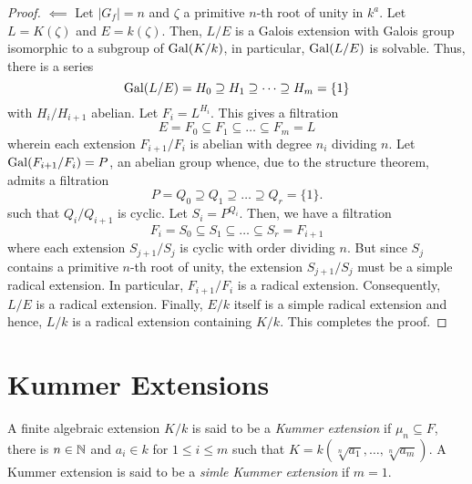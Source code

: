 \begin{proof}
    $\impliedby$ Let $|G_f| = n$ and $\zeta$ a primitive $n$-th root of unity in $k^a$. Let $L = K(\zeta)$ and $E = k(\zeta)$. Then, $L/E$ is a Galois extension with Galois group isomorphic to a subgroup of $\operatorname{Gal}(K/k)$, in particular, $\operatorname{Gal}(L/E)$ is solvable. Thus, there is a series 
    \begin{equation*}
        \operatorname{Gal}(L/E) = H_0 \supseteq H_1\supseteq\cdots\supseteq H_m = \{1\}
    \end{equation*}
    with $H_{i}/H_{i + 1}$ abelian. Let $F_i = L^{H_i}$. This gives a filtration 
    \begin{equation*}
        E = F_0\subseteq F_1\subseteq\dots\subseteq F_m = L
    \end{equation*}
    wherein each extension $F_{i + 1}/F_i$ is abelian with degree $n_i$ dividing $n$. Let $\operatorname{Gal}(F_{i + 1}/F_i) = P$, an abelian group whence, due to the structure theorem, admits a filtration 
    \begin{equation*}
        P = Q_0\supseteq Q_1\supseteq\dots\supseteq Q_r = \{1\}.
    \end{equation*}
    such that $Q_i/Q_{i + 1}$ is cyclic. Let $S_i = P^{Q_i}$. Then, we have a filtration 
    \begin{equation*}
        F_i = S_0\subseteq S_1\subseteq\dots\subseteq S_r = F_{i + 1}
    \end{equation*}
    where each extension $S_{j + 1}/S_j$ is cyclic with order dividing $n$. But since $S_j$ contains a primitive $n$-th root of unity, the extension $S_{j + 1}/S_j$ must be a simple radical extension. In particular, $F_{i + 1}/F_i$ is a radical extension. Consequently, $L/E$ is a radical extension. Finally, $E/k$ itself is a simple radical extension and hence, $L/k$ is a radical extension containing $K/k$. This completes the proof.
\end{proof}

\section{Kummer Extensions}

\begin{definition}
    A finite algebraic extension $K/k$ is said to be a \emph{Kummer extension} if $\mu_n\subseteq F$, there is $n\in\mathbb{N}$ and $a_i\in k$ for $1\le i\le m$ such that $K = k(\sqrt[n]{a_1},\dots,\sqrt[n]{a_m})$. A Kummer extension is said to be a \emph{simle Kummer extension} if $m = 1$.
\end{definition}

